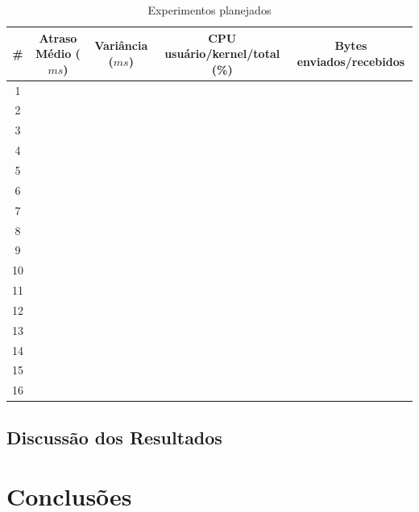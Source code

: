 \documentclass[12pt]{article}
\begin{document}
\begin{table}
  \center
  \footnotesize
  \begin{tabular}{|c|c|c|c|c|}
  \hline
    \# & \textbf{Atraso Médio ($ms$)} & \textbf{Variância ($ms$)} & \textbf{CPU usuário/kernel/total (\%)} & \textbf{Bytes enviados/recebidos} \\ \hline
    1 &  &  &  &  \\ \hline
    2 &  &  &  &  \\ \hline
    3 &  &  &  &  \\ \hline
    4 &  &  &  &  \\ \hline
    5 &  &  &  &  \\ \hline
    6 &  &  &  &  \\ \hline
    7 &  &  &  &  \\ \hline
    8 &  &  &  &  \\ \hline
    9 &  &  &  &  \\ \hline
    10 &  &  &  &  \\ \hline
    11 &  &  &  &  \\ \hline
    12 &  &  &  &  \\ \hline
    13 &  &  &  &  \\ \hline
    14 &  &  &  &  \\ \hline
    15 &  &  &  &  \\ \hline
    16 &  &  &  &  \\ \hline
  \end{tabular} 
\caption{Experimentos planejados}
\label{tab:experimentos}
\end{table} 

\subsection{Discussão dos Resultados} \label{sub:discussao}
\section{Conclusões} \label{sec:conclusoes}




\end{document}
